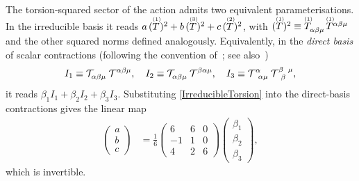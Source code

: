 The torsion-squared sector of the action admits two equivalent
parameterisations. In the irreducible basis it reads $a\,(\T[1]{})^2 +
b\,(\T[3]{})^2 + c\,(\T[2]{})^2$, with $(\T[1]{})^2 \equiv
\T[1]{_{\alpha\beta\mu}}\T[1]{^{\alpha\beta\mu}}$ and the other
squared norms defined analogously. Equivalently, in the
\emph{direct basis} of scalar contractions (following the convention
of~\cite{lin2019pgt}; see
also~\cite{sezgin1980ghostfree,shapiro2002torsion})
\begin{align}
  I_1 \equiv \MAGT{_{\alpha\beta\mu}}\MAGT{^{\alpha\beta\mu}},
  \quad
  I_2 \equiv \MAGT{_{\alpha\beta\mu}}\MAGT{^{\beta\alpha\mu}},
  \quad
  I_3 \equiv \MAGT{^\alpha_\alpha_\mu}\MAGT{^\beta_\beta^\mu},
  \label{TorsionDirectBasis}
\end{align}
it reads $\beta_1 I_1 + \beta_2 I_2 + \beta_3 I_3$. Substituting
\cref{IrreducibleTorsion} into the direct-basis
contractions gives the linear map
\begin{align}
  \begin{pmatrix} a \\ b \\ c \end{pmatrix}
  &= \frac{1}{6} \begin{pmatrix}
       6 & 6 & 0 \\
       -1 & 1 & 0 \\
       4 & 2 & 6
     \end{pmatrix}
     \begin{pmatrix} \beta_1 \\ \beta_2 \\ \beta_3 \end{pmatrix},
  \label{DirectIrreducibleTransform}
\end{align}
which is invertible.
